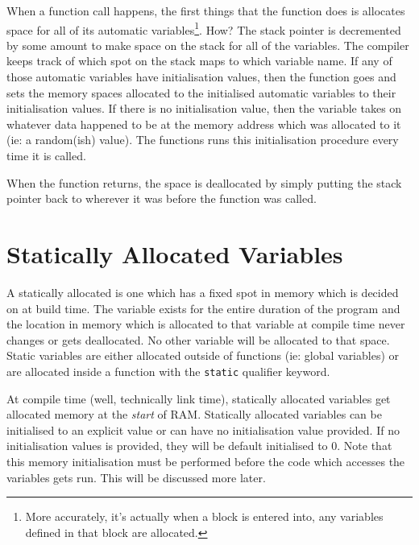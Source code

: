 When a function call happens, the first things that the function does is allocates space for all of its automatic variables\footnote{More accurately, it's actually when a block is entered into, any variables defined in that block are allocated.}. How? The stack pointer is decremented by some amount to make space on the stack for all of the variables. The compiler keeps track of which spot on the stack maps to which variable name. If any of those automatic variables have initialisation values, then the function goes and sets the memory spaces allocated to the initialised automatic variables to their initialisation values. If there is no initialisation value, then the variable takes on whatever data happened to be at the memory address which was allocated to it (ie: a random(ish) value). The functions runs this initialisation procedure every time it is called. 

When the function returns, the space is deallocated by simply putting the stack pointer back to wherever it was before the function was called. 

\section{Statically Allocated Variables}
A statically allocated is one which has a fixed spot in memory which is decided on at build time. The variable exists for the entire duration of the program and the location in memory which is allocated to that variable at compile time never changes or gets deallocated. No other variable will be allocated to that space.
Static variables are either allocated outside of functions (ie: global variables) or are allocated inside a function with the \texttt{static} qualifier keyword. 

At compile time (well, technically link time), statically allocated variables get allocated memory at the \emph{start} of RAM. Statically allocated variables can be initialised to an explicit value or can have no initialisation value provided. If no initialisation values is provided, they will be default initialised to 0. Note that this memory initialisation must be performed before the code which accesses the variables gets run. This will be discussed more later.

